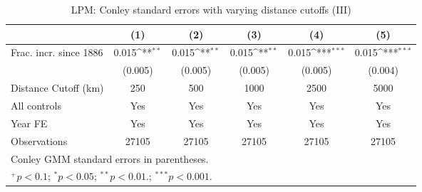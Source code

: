 \begin{table}[htbp]\centering
\def\sym#1{\ifmmode^{#1}\else\(^{#1}\)\fi}
\caption{LPM: Conley standard errors with varying distance cutoffs (III) \label{tab:rob:cnl3}}
\begin{tabular}{l*{5}{c}}
\hline\hline
                    &\multicolumn{1}{c}{(1)}         &\multicolumn{1}{c}{(2)}         &\multicolumn{1}{c}{(3)}         &\multicolumn{1}{c}{(4)}         &\multicolumn{1}{c}{(5)}         \\
\hline
Frac. incr. since 1886&       0.015\sym{**} &       0.015\sym{**} &       0.015\sym{**} &       0.015\sym{***}&       0.015\sym{***}\\
                    &     (0.005)         &     (0.005)         &     (0.005)         &     (0.005)         &     (0.004)         \\
\hline
Distance Cutoff (km)&         250         &         500         &        1000         &        2500         &        5000         \\
All controls        &         Yes         &         Yes         &         Yes         &         Yes         &         Yes         \\
Year FE             &         Yes         &         Yes         &         Yes         &         Yes         &         Yes         \\
Observations        &       27105         &       27105         &       27105         &       27105         &       27105         \\
\hline\hline
\multicolumn{6}{l}{\footnotesize Conley GMM standard errors in parentheses.}\\
\multicolumn{6}{l}{\footnotesize $^{+}p<0.1$; $^{*}p<0.05$; $^{**}p<0.01.$; $^{***}p<0.001.$ }\\
\end{tabular}
\end{table}
